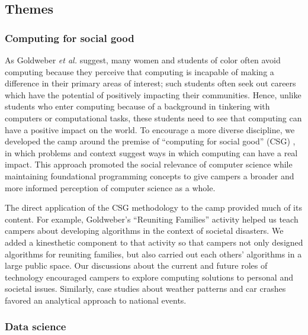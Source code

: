 \subsection{Themes}

\subsubsection{Computing for social good}

As Goldweber \textit{et al.} \cite{Goldweber2013} suggest, many women
and students of color often avoid computing because they perceive
that computing is incapable of making a difference in their primary
areas of interest; such students often seek out
careers which have the potential of positively impacting their
communities.  Hence, unlike students who enter computing because
of a background in tinkering with computers or computational tasks,
these students need to see that computing can have a positive impact
on the world.  To encourage a more diverse discipline, we developed
the camp around the premise of ``computing for social good''
(CSG) \cite{Goldweber2015}, in which problems and context suggest ways
in which computing can have a real impact.  This
approach promoted the social relevance of computer science while
maintaining foundational programming concepts to give campers a
broader and more informed perception of computer science as a whole.

The direct application of the CSG methodology to the camp provided
much of its content. For example, Goldweber's ``Reuniting Families''
activity \cite{Goldweber2012} helped us teach campers about developing algorithms in the
context of societal disasters. We added a kinesthetic component to
that activity so that campers not only designed algorithms for
reuniting families, but also carried out each others' algorithms
in a large public space.  Our discussions about the current and
future roles of technology encouraged campers to explore computing
solutions to personal and societal issues.  Similarly, case studies
about weather patterns and car crashes favored an analytical approach
to national events.

\subsubsection{Data science}

